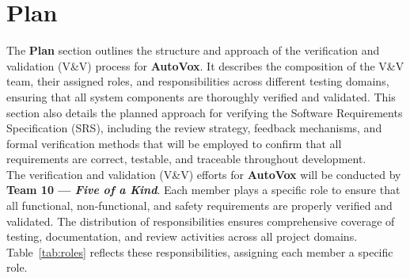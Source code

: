 \documentclass[12pt, titlepage]{article}
\begin{document}
\section{Plan}
\noindent The \textbf{Plan} section outlines the structure and approach of the verification and validation (V\&V) process for \textbf{AutoVox}. It describes the composition of the V\&V team, their assigned roles, and responsibilities across different testing domains, ensuring that all system components are thoroughly verified and validated. This section also details the planned approach for verifying the Software Requirements Specification (SRS), including the review strategy, feedback mechanisms, and formal verification methods that will be employed to confirm that all requirements are correct, testable, and traceable throughout development.\\

\noindent The verification and validation (V\&V) efforts for \textbf{AutoVox} will be conducted by \textbf{Team 10 --- \textit{Five of a Kind}}. Each member plays a specific role to ensure that all functional, non-functional, and safety requirements are properly verified and validated. The distribution of responsibilities ensures comprehensive coverage of testing, documentation, and review activities across all project domains. Table~\ref{tab:roles} reflects these responsibilities, assigning each member a specific role.\\
\end{document}

